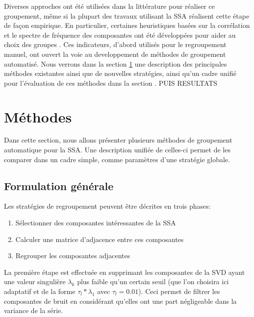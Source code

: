 \documentclass{gretsi}
\begin{document}
Diverses approches ont été utilisées dans la littérature pour réaliser ce groupement, même si la plupart des travaux utilisant la SSA réalisent cette étape de façon empirique. En particulier, certaines heuristiques basées sur la corrélation et le spectre de fréquence des composantes ont été développées pour aider au choix des groupes \cite{GNZ_10_SSA}. Ces indicateurs, d'abord utilisés pour le regroupement manuel, ont ouvert la voie au developpement de méthodes de groupement automatisé. Nous verrons dans la section \ref{sec:met} une description des principales méthodes existantes ainsi que de nouvelles stratégies, ainsi qu'un cadre unifié pour l'évaluation de ces méthodes dans la section \label{sec:eval}. PUIS RESULTATS



\section{Méthodes}
\label{sec:met}

Dans cette section, nous allons présenter plusieurs méthodes de groupement automatique pour la SSA. Une description unifiée de celles-ci permet de les comparer dans un cadre simple, comme paramètres d'une stratégie globale.

\subsection{Formulation générale}
\label{sub:form}

Les stratégies de regroupement peuvent être décrites en trois phases:
\begin{enumerate}
	\item Sélectionner des composantes intéressantes de la SSA
	\item Calculer une matrice d'adjacence entre ces composantes
	\item Regrouper les composantes adjacentes
\end{enumerate}
La première étape est effectuée en supprimant les composantes de la SVD ayant une valeur singulière $\lambda_k$ plus faible qu'un certain seuil (que l'on choisira ici adaptatif et de la forme  $\tau_l*\lambda_1$ avec $\tau_l = 0.01$). Ceci permet de filtrer les composantes de bruit en considérant qu'elles ont une part négligeable dans la variance de la série. 
\end{document}
